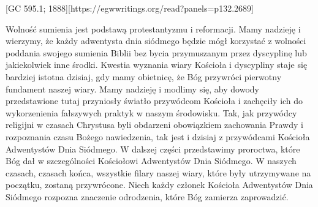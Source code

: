 [GC 595.1; 1888][https://egwwritings.org/read?panels=p132.2689]

Wolność sumienia jest podstawą protestantyzmu i reformacji. Mamy nadzieję i wierzymy, że każdy adwentysta dnia siódmego będzie mógł korzystać z wolności poddania swojego sumienia Biblii bez bycia przymuszanym przez dyscyplinę lub jakiekolwiek inne środki. Kwestia wyznania wiary Kościoła i dyscypliny staje się bardziej istotna dzisiaj, gdy mamy obietnicę, że Bóg przywróci pierwotny fundament naszej wiary. Mamy nadzieję i modlimy się, aby dowody przedstawione tutaj przyniosły światło przywódcom Kościoła i zachęciły ich do wykorzenienia fałszywych praktyk w naszym środowisku. Tak, jak przywódcy religijni w czasach Chrystusa byli obdarzeni obowiązkiem zachowania Prawdy i rozpoznania czasu Bożego nawiedzenia, tak jest i dzisiaj z przywódcami Kościoła Adwentystów Dnia Siódmego. W dalszej części przedstawimy proroctwa, które Bóg dał w szczególności Kościołowi Adwentystów Dnia Siódmego. W naszych czasach, czasach końca, wszystkie filary naszej wiary, które były utrzymywane na początku, zostaną przywrócone. Niech każdy członek Kościoła Adwentystów Dnia Siódmego rozpozna znaczenie odrodzenia, które Bóg zamierza zaprowadzić.


